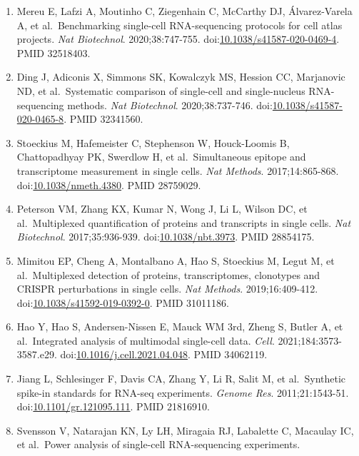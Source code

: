 \documentclass{article}
\begin{document}
\begin{enumerate}
  cells. \emph{Nat Commun}. 2017;8:14049.
  doi:\href{https://doi.org/10.1038/ncomms14049}{10.1038/ncomms14049}.
  PMID 28091601.
\item
  Mereu E, Lafzi A, Moutinho C, Ziegenhain C, McCarthy DJ,
  Álvarez-Varela A, et al.~Benchmarking single-cell RNA-sequencing
  protocols for cell atlas projects. \emph{Nat Biotechnol}.
  2020;38:747-755.
  doi:\href{https://doi.org/10.1038/s41587-020-0469-4}{10.1038/s41587-020-0469-4}.
  PMID 32518403.
\item
  Ding J, Adiconis X, Simmons SK, Kowalczyk MS, Hession CC, Marjanovic
  ND, et al.~Systematic comparison of single-cell and single-nucleus
  RNA-sequencing methods. \emph{Nat Biotechnol}. 2020;38:737-746.
  doi:\href{https://doi.org/10.1038/s41587-020-0465-8}{10.1038/s41587-020-0465-8}.
  PMID 32341560.
\item
  Stoeckius M, Hafemeister C, Stephenson W, Houck-Loomis B,
  Chattopadhyay PK, Swerdlow H, et al.~Simultaneous epitope and
  transcriptome measurement in single cells. \emph{Nat Methods}.
  2017;14:865-868.
  doi:\href{https://doi.org/10.1038/nmeth.4380}{10.1038/nmeth.4380}.
  PMID 28759029.
\item
  Peterson VM, Zhang KX, Kumar N, Wong J, Li L, Wilson DC, et
  al.~Multiplexed quantification of proteins and transcripts in single
  cells. \emph{Nat Biotechnol}. 2017;35:936-939.
  doi:\href{https://doi.org/10.1038/nbt.3973}{10.1038/nbt.3973}. PMID
  28854175.
\item
  Mimitou EP, Cheng A, Montalbano A, Hao S, Stoeckius M, Legut M, et
  al.~Multiplexed detection of proteins, transcriptomes, clonotypes and
  CRISPR perturbations in single cells. \emph{Nat Methods}.
  2019;16:409-412.
  doi:\href{https://doi.org/10.1038/s41592-019-0392-0}{10.1038/s41592-019-0392-0}.
  PMID 31011186.
\item
  Hao Y, Hao S, Andersen-Nissen E, Mauck WM 3rd, Zheng S, Butler A, et
  al.~Integrated analysis of multimodal single-cell data. \emph{Cell}.
  2021;184:3573-3587.e29.
  doi:\href{https://doi.org/10.1016/j.cell.2021.04.048}{10.1016/j.cell.2021.04.048}.
  PMID 34062119.
\item
  Jiang L, Schlesinger F, Davis CA, Zhang Y, Li R, Salit M, et
  al.~Synthetic spike-in standards for RNA-seq experiments. \emph{Genome
  Res}. 2011;21:1543-51.
  doi:\href{https://doi.org/10.1101/gr.121095.111}{10.1101/gr.121095.111}.
  PMID 21816910.
\item
  Svensson V, Natarajan KN, Ly LH, Miragaia RJ, Labalette C, Macaulay
  IC, et al.~Power analysis of single-cell RNA-sequencing experiments.

\end{enumerate}
\end{document}
